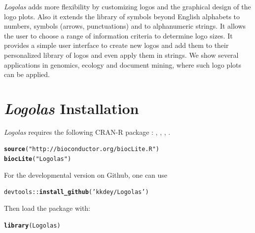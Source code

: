 \documentclass[12pt]{article}\usepackage[]{graphicx}\usepackage[usenames,dvipsnames]{color}
\makeatletter
\newcommand{\hlstr}[1]{\textcolor[rgb]{0.192,0.494,0.8}{#1}}%
\newcommand{\hlopt}[1]{\textcolor[rgb]{0,0,0}{#1}}%
\newcommand{\hlstd}[1]{\textcolor[rgb]{0.345,0.345,0.345}{#1}}%
\newcommand{\hlkwd}[1]{\textcolor[rgb]{0.737,0.353,0.396}{\textbf{#1}}}%
\newenvironment{kframe}{%
 \def\at@end@of@kframe{}%
 \ifinner\ifhmode%
  \def\at@end@of@kframe{\end{minipage}}%
  \begin{minipage}{\columnwidth}%
 \fi\fi%
 \def\FrameCommand##1{\hskip\@totalleftmargin \hskip-\fboxsep
 \colorbox{shadecolor}{##1}\hskip-\fboxsep
     \hskip-\linewidth \hskip-\@totalleftmargin \hskip\columnwidth}%
 \MakeFramed {\advance\hsize-\width
   \@totalleftmargin\z@ \linewidth\hsize
   \@setminipage}}%
 {\par\unskip\endMakeFramed%
 \at@end@of@kframe}
\newenvironment{knitrout}{}{} %
\newcommand{\Logolas}{\textit{Logolas}}
\makeatother
\begin{document}
\Logolas{} adds more flexibility by customizing logos and the graphical design of the logo plots. Also it extends the library of symbols beyond English alphabets to numbers, symbols (arrows, punctuations) and to alphanumeric strings. It allows the user to choose a range of information criteria to determine logo sizes. It provides a simple user interface to create new logos and add them to their personalized library of logos and even apply them in strings. We show several applications in genomics, ecology and document mining, where such logo plots can be applied.

\newpage

\section{\Logolas{} Installation}

\Logolas{} requires the following CRAN-R package : , , , .

\begin{knitrout}
\color{fgcolor}\begin{kframe}
\begin{alltt}
\hlkwd{source}\hlstd{(}\hlstr{"http://bioconductor.org/biocLite.R"}\hlstd{)}
\hlkwd{biocLite}\hlstd{(}\hlstr{"Logolas"}\hlstd{)}
\end{alltt}
\end{kframe}
\end{knitrout}

For the developmental version on Github, one can use

\begin{knitrout}
\color{fgcolor}\begin{kframe}
\begin{alltt}
\hlstd{devtools}\hlopt{::}\hlkwd{install_github}\hlstd{(}\hlstr{'kkdey/Logolas'}\hlstd{)}
\end{alltt}
\end{kframe}
\end{knitrout}

Then load the package with:

\begin{knitrout}
\color{fgcolor}\begin{kframe}
\begin{alltt}
\hlkwd{library}\hlstd{(Logolas)}
\end{alltt}
\end{kframe}
\end{knitrout}
\end{document}
